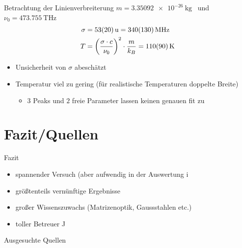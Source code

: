 \documentclass[10pt, aspectratio=169]{beamer}
\begin{document}
\begin{frame}{Betrachtung der Linienverbreiterung}
  \(m=\SI{3.35092e-26}{\kg}\)~\cite{IUPAC2013} und
  \(\nu_0=\SI{473.755}{\tera\hertz}\) ~\cite[226]{Sigrist2018}
  \begin{align}
    \sigma & = \SI{53\pm 20}{u} = \SI{340\pm 130}{\mega\hertz} \\
    T & = \qty(\frac{\sigma\cdot c}{\nu_0})^2\cdot \frac{m}{k_B}=\SI{110\pm 90}{\kelvin}
  \end{align}
  \begin{itemize}
  \item<1-> Unsicherheit von \(\sigma\) abesch\"atzt
  \item<2-> Temperatur viel zu gering (f\"ur realistische Temperaturen
    doppelte Breite)
    \begin{itemize}
    \item \(3\) Peaks und \(2\) freie Parameter lassen keinen genauen
      fit zu
    \end{itemize}
  \end{itemize}
\end{frame}




\section{Fazit/Quellen}

\begin{frame}{Fazit}
  \begin{itemize}
  \item<1-> spannender Versuch (aber aufwendig in der Auswertung ^^)
  \item<2-> gr\"o\ss{}tenteils vern\"unftige Ergebnisse
  \item<3-> gro\ss{}er Wissenszuwachs (Matrizenoptik, Gaussstahlen
    etc.)
  \item<4-> toller Betreuer ^^
  \end{itemize}
\end{frame}
\begin{frame}[allowframebreaks]{Ausgesuchte Quellen}
  \printbibliography
\end{frame}
\end{document}
